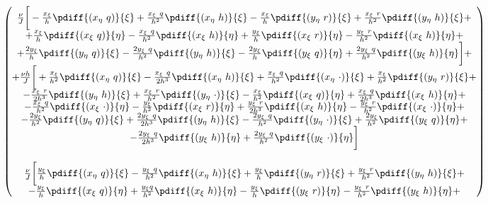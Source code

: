 {{\begin{align}
\begin{pmatrix}
		\frac{\nu}{J} \bigg[
		- \frac{x_{\xi} }{h}\pdiff{(x_{\eta}\ q)}{\xi}
		+ \frac{x_{\xi}\ q}{h^2}\pdiff{(x_{\eta}\ h)}{\xi}
		- \frac{x_{\xi}}{h} \pdiff{(y_{\eta}\ r)}{\xi}
		+ \frac{x_{\xi}\ r}{h^2}\pdiff{(y_{\eta}\ h)}{\xi} + \\
		+ \frac{x_{\xi}}{h} \pdiff{(x_{\xi}\ q)}{\eta}
		- \frac{x_{\xi}\ q}{h^2}\pdiff{(x_{\xi}\ h)}{\eta}
		+ \frac{y_{\xi}}{h} \pdiff{(x_{\xi}\ r)}{\eta}
		- \frac{y_{\xi}\ r}{h^2} \pdiff{(x_{\xi}\ h)}{\eta} + \\
		+ \frac{2 y_{\xi}}{h} \pdiff{(y_{\eta}\ q)}{\xi}
		- \frac{2 y_{\xi}\ q}{h^2} \pdiff{(y_{\eta}\ h)}{\xi}
		- \frac{2 y_{\xi}}{h} \pdiff{(y_{\xi}\ q)}{\eta}
		+ \frac{2 y_{\xi}\ q}{h^2} \pdiff{(y_{\xi}\ h)}{\eta}
		\bigg] + \\
		+ \frac{\nu h}{J} \bigg[
		+ \frac{x_{\xi} }{h^2}\pdiff{(x_{\eta}\ q)}{\xi}
		- \frac{x_{\xi}\ q}{2h^3}\pdiff{(x_{\eta}\ h)}{\xi}
		+ \frac{x_{\xi}\ q}{h^2}\pdiff{(x_{\eta}\ \cdot)}{\xi}
		+ \frac{x_{\xi}}{h^2} \pdiff{(y_{\eta}\ r)}{\xi} + \\
		- \frac{x_{\xi}\ r}{2h^3}\pdiff{(y_{\eta}\ h)}{\xi}
		+ \frac{x_{\xi}\ r}{h^2}\pdiff{(y_{\eta}\ \cdot)}{\xi}
		- \frac{x_{\xi}}{h^2} \pdiff{(x_{\xi}\ q)}{\eta}
		+ \frac{x_{\xi}\ q}{2h^3}\pdiff{(x_{\xi}\ h)}{\eta} + \\
		- \frac{x_{\xi}\ q}{h^2}\pdiff{(x_{\xi}\ \cdot)}{\eta}
		- \frac{y_{\xi}}{h^2} \pdiff{(x_{\xi}\ r)}{\eta}
		+ \frac{y_{\xi}\ r}{2h^3} \pdiff{(x_{\xi}\ h)}{\eta}
		- \frac{y_{\xi}\ r}{h^2} \pdiff{(x_{\xi}\ \cdot)}{\eta} + \\
		- \frac{2 y_{\xi}}{h^2} \pdiff{(y_{\eta}\ q)}{\xi}
		+ \frac{2 y_{\xi}\ q}{2h^3} \pdiff{(y_{\eta}\ h)}{\xi}
		- \frac{2 y_{\xi}\ q}{h^2} \pdiff{(y_{\eta}\ \cdot)}{\xi}
		+ \frac{2 y_{\xi}}{h^2} \pdiff{(y_{\xi}\ q)}{\eta}  + \\
		- \frac{2 y_{\xi}\ q}{2h^3} \pdiff{(y_{\xi}\ h)}{\eta}
		+ \frac{2 y_{\xi}\ q}{h^2} \pdiff{(y_{\xi}\ \cdot)}{\eta}
		\bigg]
        \\
		\\
		\frac{\nu}{J} \bigg[
		\frac{y_{\xi} }{h} \pdiff{(x_{\eta}\ q)}{\xi}
		- \frac{y_{\xi}\ q}{h^2} \pdiff{(x_{\eta}\ h)}{\xi}
		+ \frac{y_{\xi} }{h} \pdiff{(y_{\eta}\ r)}{\xi}
		+ \frac{y_{\xi}\ r}{h^2} \pdiff{(y_{\eta}\ h)}{\xi}  + \\
		- \frac{y_{\xi}}{h} \pdiff{(x_{\xi}\ q)}{\eta}
		+ \frac{y_{\xi}q}{h^2} \pdiff{(x_{\xi}\ h)}{\eta}
		- \frac{y_{\xi}}{h} \pdiff{(y_{\xi}\ r)}{\eta}
		- \frac{y_{\xi}\ r}{h^2} \pdiff{(y_{\xi}\ h)}{\eta}  + \\

\end{pmatrix}
\end{align}}}
